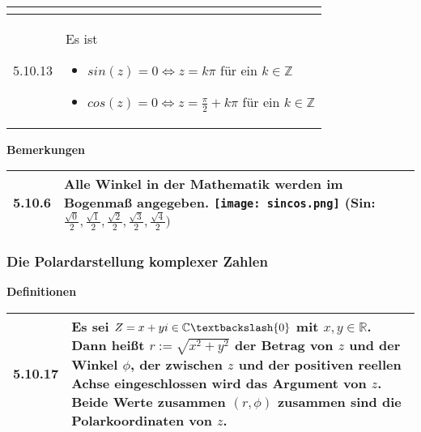 \begin{longtable}{p{1cm} p{16cm}}
\begin{itemize}[topsep=-0.5cm]
                \end{itemize} \vspace{-0cm} \\
        \midrule
        5.10.13&Es ist
                \begin{itemize}[topsep=-0.5cm]
                    \item[] $sin(z) = 0 \Leftrightarrow z = k\pi$ für ein $k \in \mathbb{Z}$
                    \item[] $cos(z) = 0 \Leftrightarrow z = \frac{\pi}{2}+k\pi$ für ein $k \in \mathbb{Z}$ 
                \end{itemize} \vspace{-0cm} \\

        \bottomrule
    \end{longtable}
    

    \noindent
    \textbf{Bemerkungen}
    
    \begin{longtable}{p{1cm} p{16cm}}
        \toprule

        5.10.6& Alle Winkel in der Mathematik werden im Bogenmaß angegeben. \hfill \break
                \texttt{[image: sincos.png]} \hfill \break
                (Sin: $\frac{\sqrt{0}}{2},\frac{\sqrt{1}}{2},\frac{\sqrt{2}}{2},\frac{\sqrt{3}}{2},\frac{\sqrt{4}}{2})$\\

        \bottomrule
    \end{longtable}
    

\subsubsection{Die Polardarstellung komplexer Zahlen}

    \noindent
    \textbf{Definitionen}
      
    \begin{longtable}{p{1cm} p{16cm}}
        \toprule

        5.10.17&Es sei $Z = x + yi \in \mathbb{C} \textbackslash \{0\}$ mit $x,y \in \mathbb{R}$. Dann heißt $r:= \sqrt{x^2+y^2}$ der \textbf{Betrag}
                von $z$ und der Winkel $\phi$, der zwischen $z$ und der positiven reellen Achse eingeschlossen wird das \textbf{Argument} von $z$.
                Beide Werte zusammen $(r,\phi)$ zusammen sind die \textbf{Polarkoordinaten} von $z$.\\

        \bottomrule

    \end{longtable}
    


